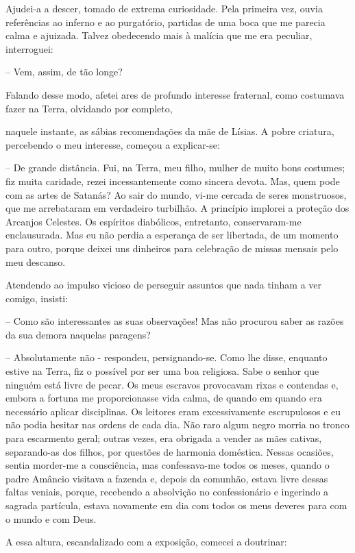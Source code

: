 \documentclass[portuguese,12pt,a4paper]{scrbook}
\begin{document}
	Ajudei-a a descer, tomado de extrema curiosidade. Pela primeira vez, ouvia referências ao inferno e ao purgatório, partidas de uma boca que me parecia calma e ajuizada. Talvez obedecendo mais à malícia que me era peculiar, interroguei:
	
	– Vem, assim, de tão longe?
	
	Falando desse modo, afetei ares de profundo interesse fraternal, como costumava fazer na Terra, olvidando por completo,
	
	
	naquele instante, as sábias recomendações da mãe de Lísias. A pobre criatura, percebendo o meu interesse, começou a explicar-se:
	
	– De grande distância. Fui, na Terra, meu filho, mulher de muito bons costumes; fiz muita caridade, rezei incessantemente como sincera devota. Mas, quem pode com as artes de Satanás? Ao sair do mundo, vi-me cercada de seres monstruosos, que me arrebataram em verdadeiro turbilhão. A princípio implorei a proteção dos Arcanjos Celestes. Os espíritos diabólicos, entretanto, conservaram-me enclausurada. Mas eu não perdia a esperança de ser libertada, de um momento para outro, porque deixei uns dinheiros para celebração de missas mensais pelo meu descanso.
	
	Atendendo ao impulso vicioso de perseguir assuntos que nada tinham a ver comigo, insisti:
	
	– Como são interessantes as suas observações! Mas não procurou saber as razões da sua demora naquelas paragens?
	
	– Absolutamente não - respondeu, persignando-se. Como lhe disse, enquanto estive na Terra, fiz o possível por ser uma boa religiosa. Sabe o senhor que ninguém está livre de pecar. Os meus escravos provocavam rixas e contendas e, embora a fortuna me proporcionasse vida calma, de quando em quando era necessário aplicar disciplinas. Os leitores eram excessivamente escrupulosos e eu não podia hesitar nas ordens de cada dia. Não raro algum negro morria no tronco para escarmento geral; outras vezes, era obrigada a vender as mães cativas, separando-as dos filhos, por questões de harmonia doméstica. Nessas ocasiões, sentia morder-me a consciência, mas confessava-me todos os meses, quando o padre Amâncio visitava a fazenda e, depois da comunhão, estava livre dessas faltas veniais, porque, recebendo a absolvição no confessionário e ingerindo a sagrada partícula, estava novamente em dia com todos os meus deveres para com o mundo e com Deus.
	
	
	A essa altura, escandalizado com a exposição, comecei a doutrinar:
	
\end{document}
